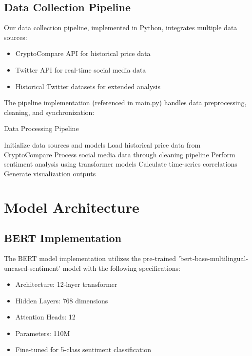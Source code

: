 \documentclass[12pt,a4paper]{report}
\begin{document}
\subsection{Data Collection Pipeline}
Our data collection pipeline, implemented in Python, integrates multiple data
sources:

\begin{itemize}
    \item CryptoCompare API for historical price data
    \item Twitter API for real-time social media data
    \item Historical Twitter datasets for extended analysis
\end{itemize}

The pipeline implementation (referenced in main.py) handles data preprocessing,
cleaning, and synchronization:

\begin{algorithm}
    \caption{Data Processing Pipeline}
    \begin{algorithmic}[1]
        \State Initialize data sources and models
        \State Load historical price data from CryptoCompare
        \State Process social media data through cleaning pipeline
        \State Perform sentiment analysis using transformer models
        \State Calculate time-series correlations
        \State Generate visualization outputs
    \end{algorithmic}
\end{algorithm}

\section{Model Architecture}
\subsection{BERT Implementation}
The BERT model implementation utilizes the pre-trained
'bert-base-multilingual-uncased-sentiment' model with the following
specifications:

\begin{itemize}
    \item Architecture: 12-layer transformer
    \item Hidden Layers: 768 dimensions
    \item Attention Heads: 12
    \item Parameters: 110M
    \item Fine-tuned for 5-class sentiment classification
\end{itemize}
\end{document}

